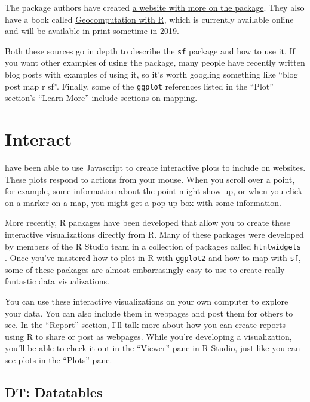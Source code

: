 \documentclass[]{tufte-book}
\begin{document}
The package authors have created
\href{https://cran.r-project.org/web/packages/sf/vignettes/sf1.html}{a website with more on the package}.
They also have a book called \href{https://geocompr.robinlovelace.net/}{Geocomputation with R}, which
is currently available online and will be available in print sometime in 2019.

Both these sources go in depth to describe the \texttt{sf} package and how to use it. If you want
other examples of using the package, many people have recently written blog posts with examples
of using it, so it's worth googling something like ``blog post map r sf''. Finally, some of the
\texttt{ggplot} references listed in the ``Plot'' section's ``Learn More'' include sections on mapping.

\hypertarget{interact}{%
\chapter{Interact}\label{interact}}

 have been able to use Javascript to create
interactive plots to include on
websites. These plots respond to actions from your mouse. When you scroll over a point,
for example, some information about the point might show up, or when you click on a marker
on a map, you might get a pop-up box with some information.

More recently, R packages have been developed that allow you to create these interactive
visualizations directly from R. Many of these packages were developed by members of the
R Studio team in a collection of packages called \texttt{htmlwidgets} \citep{R-htmlwidgets}. Once you've
mastered how to plot in R with \texttt{ggplot2} and how to map with \texttt{sf}, some of these packages
are almost embarrasingly easy to use to create really fantastic data visualizations.

You can use these interactive visualizations on your own computer to explore your
data. You can also include them in webpages and post them for others to see. In the
``Report'' section, I'll talk more about how you can create reports using R to share or post as
webpages. While you're developing a visualization, you'll be able to check it out in
the ``Viewer'' pane in R Studio, just like you can see plots in the ``Plots'' pane.

\hypertarget{dt-datatables}{%
\section{DT: Datatables}\label{dt-datatables}}
\end{document}
